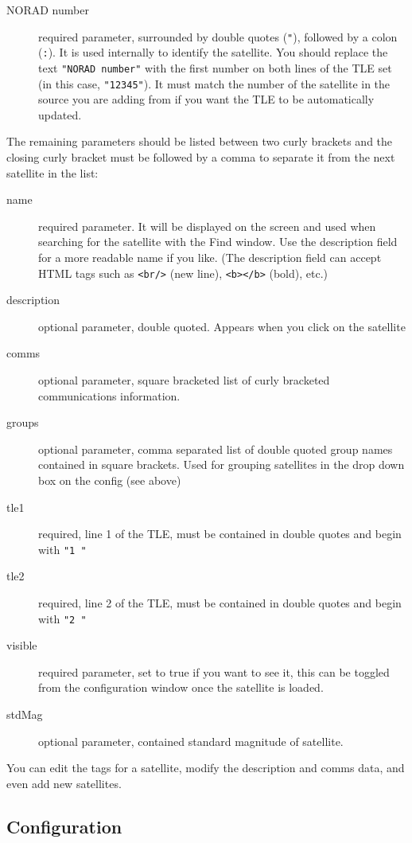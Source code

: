 \begin{description}
\item[NORAD number]  required parameter, surrounded by double quotes (\texttt{"}),
followed by a colon (\texttt{:}). It is used internally to identify the
satellite. You should replace the text \texttt{"NORAD number"} with the first number on both lines of the TLE set (in this case, \texttt{"12345"}). It must match the number of the satellite in the source you are adding from if you want the TLE to be automatically updated.
\end{description}
The remaining parameters should be listed between two curly brackets and the closing curly bracket must be followed by a comma to separate it from the next satellite in the list:

\begin{description}
\item[name] required parameter. It will be displayed on the screen and used
when searching for the satellite with the Find window. Use the
description field for a more readable name if you like. (The
description field can accept HTML tags such as \texttt{<br/>} (new line), \texttt{<b></b>} (bold), etc.)

\item[description] optional parameter, double quoted. Appears when you click on the satellite \item[comms] optional parameter, square bracketed list of curly bracketed communications information.
\item[groups]  optional parameter, comma separated list of double quoted group names contained in square brackets. Used for grouping satellites in the drop down box on the config (see above)
\item[tle1]  required, line 1 of the TLE, must be contained in double quotes and begin with \texttt{"1~"}
\item[tle2]  required, line 2 of the TLE, must be contained in double quotes and begin with \texttt{"2~"}
\item[visible]  required parameter, set to true if you want to see it, this can be toggled from the configuration window once the satellite is loaded. 
\item[stdMag]  optional parameter, contained standard magnitude of satellite. 
\end{description}
You can edit the tags for a satellite, modify the description and comms data, and even add new satellites. 

\subsection{Configuration}

